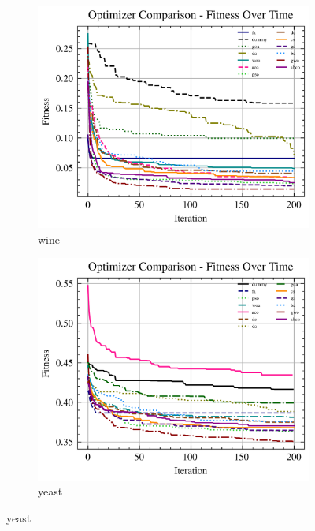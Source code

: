 \begin{figure}[htp]
    \begin{subfigure}[b]{0.45\textwidth}
        \includegraphics[width=\textwidth]{imagenes/fitness_charts/img/binary/wine/optimizers_fitness_svc.png}
        \caption{wine}
        \label{fig:convergencia_wine_svc}
    \end{subfigure}
    \begin{subfigure}[b]{0.45\textwidth}
        \includegraphics[width=\textwidth]{imagenes/fitness_charts/img/binary/yeast/optimizers_fitness_svc.png}
        \caption{yeast}
        \label{fig:convergencia_yeast_svc}
    \end{subfigure}


\end{figure}
